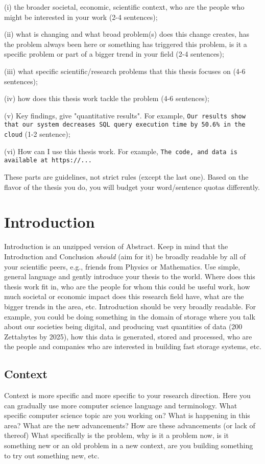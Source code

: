 \documentclass{article}
\begin{document}
\noindent (i) the broader societal, economic, scientific context, who are the people who might be interested in your work (2-4 sentences);

\noindent (ii) what is changing and what broad problem(s) does this change creates, has the problem always been here or something has triggered this problem, is it a specific problem or part of a bigger trend in your field (2-4 sentences); 

\noindent (iii) what specific scientific/research problems that this thesis focuses on (4-6 sentences); 

\noindent (iv) how does this thesis work tackle the problem (4-6 sentences); 

\noindent (v) Key findings, give "quantitative results". For example, \texttt{Our results show that our system decreases SQL query execution time by 50.6\% in the cloud} (1-2 sentence); 

\noindent (vi) How can I use this thesis work. For example, \texttt{The code, and data is available at https://...}  


These parts are guidelines, not strict rules (except the last one). Based on the flavor of the thesis you do, you will budget your word/sentence quotas differently. 

\newpage 
\section{Introduction} 
Introduction is an unzipped version of Abstract. Keep in mind that the Introduction and Conclusion \textit{should} (aim for it) be broadly readable by all of your scientific peers, e.g., friends from Physics or Mathematics. Use simple, general language and gently introduce your thesis to the world. Where does this thesis work fit in, who are the people for whom this could be useful work, how much societal or economic impact does this research field have, what are the bigger trends in the area, etc. Introduction should be very broadly readable. For example, you could be doing something in the domain of storage where you talk about our societies being digital, and producing vast quantities of data (200 Zettabytes by 2025), how this data is generated, stored and processed, who are the people and companies who are interested in building fast storage systems, etc. 
\subsection{Context}
Context is more specific and more specific to your research direction. Here you can gradually use more computer science language and terminology. What specific computer science topic are you working on? What is happening in this area? What are the new advancements? How are these advancements (or lack of thereof) What specifically is the problem, why is it a problem now, is it something new or an old problem in a new context, are you building something to try out something new, etc. 
\end{document}
